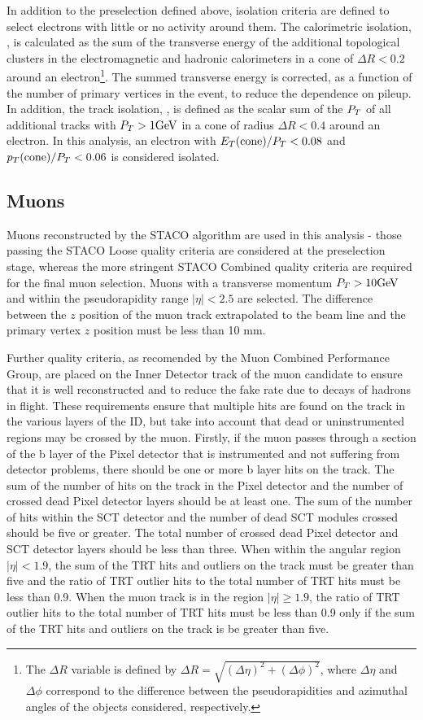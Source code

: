 In addition to the preselection defined above, isolation criteria are
defined to select electrons with little or no activity around
them. The calorimetric isolation, \etcone, is calculated as the sum of
the transverse energy of the additional topological clusters in the
electromagnetic and hadronic calorimeters in a cone of $\Delta R <
0.2$ around an electron\footnote{The $\Delta R$ variable is defined by
$\Delta R=\sqrt{(\Delta\eta)^2+(\Delta\phi)^2}$, where $\Delta \eta$
and $\Delta \phi$ correspond to the difference between
the pseudorapidities and azimuthal angles of the objects considered, respectively.}. 
The summed transverse energy is corrected, as a function of the
number of primary vertices in the event, to reduce the dependence on
pileup. In addition, the track isolation, \ptcone, is defined as the
scalar sum of the $P_{T}$ of all additional tracks with $P_{T}>1\text{GeV}$ in a
cone of radius $\Delta R<0.4$ around an electron. In this analysis, an
electron with $E_{T}(\mathrm{cone})/P_{T}<0.08$ and $p_{T}(\mathrm{cone})/P_{T}<0.06$ is considered isolated.


\subsection{Muons}
\label{sec:presel:muon}

Muons reconstructed by the STACO algorithm \cite{AtlasCSCBook} are
used in this analysis - those passing the STACO Loose quality criteria
are considered at the preselection stage, whereas the more stringent
STACO Combined quality criteria are required for the final muon
selection. Muons with a transverse momentum $P_{T} > 10\text{GeV}$ and
within the pseudorapidity range $|\eta| < 2.5$ are selected. The
difference between the $z$ position of the muon track extrapolated to
the beam line and the primary vertex $z$ position must be less than 10
mm. 

Further quality criteria, as recomended by the Muon Combined Performance Group,
 are placed on the Inner Detector track of
the muon candidate to ensure that it is well reconstructed and to
reduce the fake rate due to decays of hadrons in flight. These
requirements ensure that multiple hits are found on the track in the
various layers of the ID, but take into account that dead or
uninstrumented regions may be crossed by the muon. Firstly, if the
muon passes through a section of the b layer of the Pixel detector
that is instrumented and not suffering from detector problems, there
should be one or more b layer hits on the track. The sum of the number
of hits on the track in the Pixel detector and the number of crossed
dead Pixel detector layers should be at least one. The sum of the
number of hits within the SCT detector and the number of dead SCT
modules crossed should be five or greater. The total number of crossed
dead Pixel detector and SCT detector layers should be less than three.
When within the angular region $|\eta|<1.9$, the sum of the TRT hits
and outliers on the track must be greater than five and the ratio of
TRT outlier hits to the total number of TRT hits must be less than
0.9. When the muon track is in the region $|\eta|\ge1.9$, the ratio of
TRT outlier hits to the total number of TRT hits must be less than 0.9
only if the sum of the TRT hits and outliers on the track is be
greater than five.


